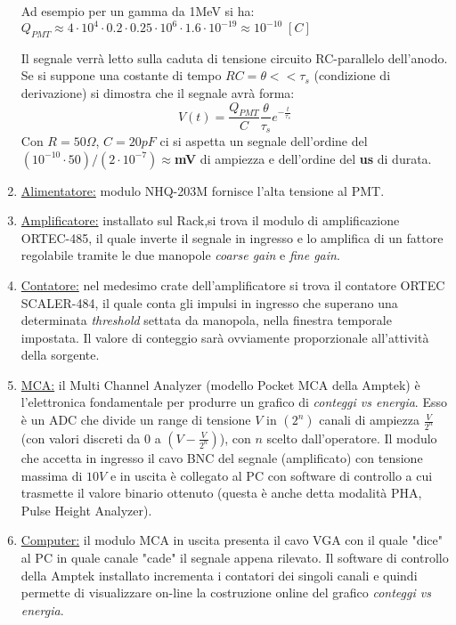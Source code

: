 \documentclass[12pt,a4paper,openright,twoside]{article}
\numberwithin{equation}{section} %
\begin{document}
\begin{enumerate}
 Ad esempio per un gamma da 1MeV si ha:
 $Q_{PMT} \approx 4 \cdot 10^4 \cdot 0.2 \cdot 0.25 \cdot 10^6 \cdot 1.6 \cdot 10^{-19} \approx 10^{-10} \; [C]$

Il segnale verrà letto sulla caduta di tensione circuito RC-parallelo dell'anodo. Se si suppone una costante di tempo $RC=\theta << \tau_{s}$ (condizione di derivazione) si dimostra che il segnale avrà forma:
\begin{equation}
V(t)=\frac{Q_{PMT}}{C} \frac{\theta}{\tau_{s}} e^{- \frac{t}{\tau_{s}}}
\end{equation}
Con $R=50 \Omega$, $C=20 pF$ ci si aspetta un segnale dell'ordine del $(10^{-10} \cdot 50) /(2 \cdot 10^{-7}) \approx $\textbf{mV} di ampiezza e dell'ordine del \textbf{ us} di durata.

\item \underline{Alimentatore:} modulo NHQ-203M fornisce l'alta tensione al PMT.
\item \underline{Amplificatore:} installato sul Rack,si trova il modulo di amplificazione ORTEC-485, il quale inverte il segnale in ingresso e lo amplifica di un fattore regolabile tramite le due manopole  \textit{coarse gain} e \textit{fine gain}. 

\item \underline{Contatore:} nel medesimo crate dell'amplificatore si trova il contatore ORTEC SCALER-484, il quale conta gli impulsi in ingresso che superano una determinata \textit{threshold} settata da manopola, nella finestra temporale impostata. Il valore di conteggio sarà ovviamente proporzionale all'attività della sorgente.

\item \underline{MCA:} il Multi Channel Analyzer (modello Pocket MCA della Amptek) è l'elettronica fondamentale per produrre un grafico di \textit{conteggi vs energia}. Esso è un ADC che divide un range di tensione $V$ in $(2^n)$ canali di ampiezza $\frac{V}{2^n}$ (con valori discreti da $0$ a $\left( V-\frac{V}{2^n} \right)$), con $n$ scelto dall'operatore.  Il modulo che accetta in ingresso il cavo BNC del segnale (amplificato) con tensione massima di $10V$ e in uscita è collegato al PC con software di controllo a cui trasmette il valore binario ottenuto (questa è anche detta modalità PHA, Pulse Height Analyzer). 

\item \underline{Computer:} il modulo MCA in uscita presenta il cavo VGA con il quale "dice" al PC in quale canale "cade" 
 il segnale appena rilevato. Il software di controllo della Amptek installato incrementa i contatori dei singoli canali e quindi permette di visualizzare on-line la costruzione online del grafico \textit{conteggi vs energia}.


\end{enumerate}
\end{document}
